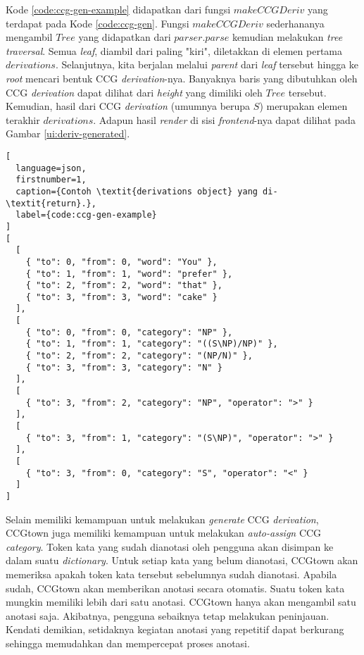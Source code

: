 Kode \ref{code:ccg-gen-example} didapatkan dari fungsi $makeCCGDeriv$ yang terdapat pada
Kode \ref{code:ccg-gen}. Fungsi $makeCCGDeriv$ sederhananya mengambil $Tree$ yang didapatkan
dari $parser.parse$ kemudian melakukan \textit{tree traversal}. Semua \textit{leaf}, diambil
dari paling "kiri", diletakkan di elemen pertama $derivations$. Selanjutnya, kita berjalan
melalui \textit{parent} dari \textit{leaf} tersebut hingga ke \textit{root} mencari bentuk CCG
\textit{derivation}-nya. Banyaknya baris yang dibutuhkan oleh CCG \textit{derivation} dapat
dilihat dari \textit{height} yang dimiliki oleh $Tree$ tersebut. Kemudian, hasil dari CCG
\textit{derivation} (umumnya berupa $S$) merupakan elemen terakhir $derivations$.
Adapun hasil \textit{render} di sisi \textit{frontend}-nya dapat dilihat pada Gambar
\ref{ui:deriv-generated}.

\begin{lstlisting}[
  language=json,
  firstnumber=1,
  caption={Contoh \textit{derivations object} yang di-\textit{return}.},
  label={code:ccg-gen-example}
]
[
  [
    { "to": 0, "from": 0, "word": "You" },
    { "to": 1, "from": 1, "word": "prefer" },
    { "to": 2, "from": 2, "word": "that" },
    { "to": 3, "from": 3, "word": "cake" }
  ],
  [
    { "to": 0, "from": 0, "category": "NP" },
    { "to": 1, "from": 1, "category": "((S\NP)/NP)" },
    { "to": 2, "from": 2, "category": "(NP/N)" },
    { "to": 3, "from": 3, "category": "N" }
  ],
  [
    { "to": 3, "from": 2, "category": "NP", "operator": ">" }
  ],
  [
    { "to": 3, "from": 1, "category": "(S\NP)", "operator": ">" }
  ],
  [
    { "to": 3, "from": 0, "category": "S", "operator": "<" }
  ]
]
\end{lstlisting}

Selain memiliki kemampuan untuk melakukan \textit{generate} CCG \textit{derivation},
CCGtown juga memiliki kemampuan untuk melakukan \textit{auto-assign} CCG \textit{category}.
Token kata yang sudah dianotasi oleh pengguna akan disimpan ke dalam suatu \textit{dictionary}.
Untuk setiap kata yang belum dianotasi, CCGtown akan memeriksa apakah token kata tersebut
sebelumnya sudah dianotasi. Apabila sudah, CCGtown akan memberikan anotasi secara otomatis.
Suatu token kata mungkin memiliki lebih dari satu anotasi. CCGtown hanya akan mengambil satu
anotasi saja. Akibatnya, pengguna sebaiknya tetap melakukan peninjauan.
Kendati demikian, setidaknya kegiatan anotasi yang repetitif dapat berkurang sehingga memudahkan
dan mempercepat proses anotasi.
\\


